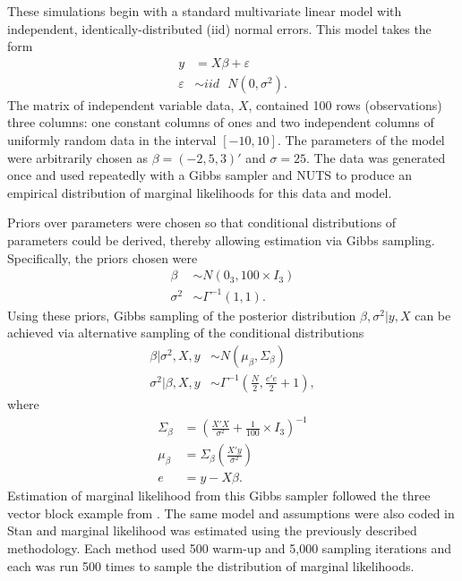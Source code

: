 \documentclass[twocolumn]{article}
\newcommand{\ep}{\varepsilon}
\begin{document}
These simulations begin with a standard multivariate linear model with independent, identically-distributed (iid) normal errors. This model takes the form
\begin{subequations}
\begin{align}
	y &= X\beta + \ep \\
	\ep &\sim iid \mbox{ }N(0, \sigma^2). 
\end{align}
\end{subequations}
The matrix of independent variable data, $X$, contained 100 rows (observations) three columns: one constant columns of ones and two independent columns of uniformly random data in the interval $[-10, 10]$. The parameters of the model were arbitrarily chosen as $\beta = (-2, 5, 3)'$ and $\sigma = 25$. The data was generated once and used repeatedly with a Gibbs sampler and NUTS to produce an empirical distribution of marginal likelihoods for this data and model.

Priors over parameters were chosen so that conditional distributions of parameters could be derived, thereby allowing estimation via Gibbs sampling. Specifically, the priors chosen were
\begin{subequations}
\begin{align}
	\beta &\sim N(0_3, 100\times I_3)\\
	\sigma^2 &\sim \Gamma^{-1}(1, 1).
\end{align}
\end{subequations}
Using these priors, Gibbs sampling of the posterior distribution $\beta, \sigma^2|y, X$ can be achieved via alternative sampling of the conditional distributions
\begin{subequations}
\begin{align}
	\beta|\sigma^2, X, y &\sim N(\mu_\beta, \Sigma_\beta) \\
	\sigma^2|\beta, X, y &\sim \Gamma^{-1}\left(\frac{N}2, \frac{e'e}2 + 1\right),
\end{align}
\end{subequations}
where
\begin{subequations}
\begin{align}
	\Sigma_\beta &= \left(\frac{X'X}{\sigma^2} + \frac1{100}\times I_3\right)^{-1}\\
	\mu_\beta &= \Sigma_\beta\left(\frac{X'y}{\sigma^2}\right)\\
	e &= y - X\beta.
\end{align}
\end{subequations}
Estimation of marginal likelihood from this Gibbs sampler followed the three vector block example from \cite{Chib}. The same model and assumptions were also coded in Stan and marginal likelihood was estimated using the previously described methodology. Each method used 500 warm-up and 5,000 sampling iterations and each was run 500 times to sample the distribution of marginal likelihoods.
\end{document}
